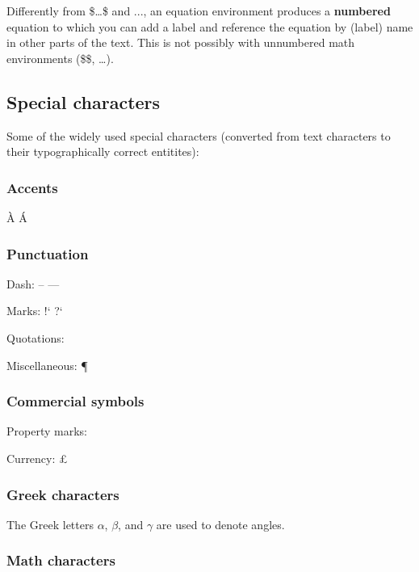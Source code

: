 \documentclass[11pt]{article}
\begin{document}
Differently from \$\ldots{}\$ and \(...\), an equation environment produces a \textbf{numbered}
equation to which you can add a label and reference the equation by (label)
name in other parts of the text. This is not possibly with unnumbered math
environments (\$\$, \ldots{}).

\subsection*{Special characters}
\label{sec:org8ce5af5}

Some of the widely used special characters (converted from text characters to
their typographically correct entitites):

\subsubsection*{Accents}
\label{sec:orgedafc60}

\`{A} \'{A}

\subsubsection*{Punctuation}
\label{sec:org3661bf6}

Dash: -- ---

Marks: !` ?`

Quotations: \guillemotleft{} \guillemotright{}

Miscellaneous: \P{} \textordfeminine{}

\subsubsection*{Commercial symbols}
\label{sec:orga0d2175}

Property marks: \textcopyright{} \textregistered{}

Currency: \textcent{} \texteuro{} \textyen{} \pounds{}

\subsubsection*{Greek characters}
\label{sec:org04d3b73}

The Greek letters \(\alpha\), \(\beta\), and \(\gamma\) are used to denote angles.

\subsubsection*{Math characters}
\label{sec:org8bbe71c}
\end{document}
